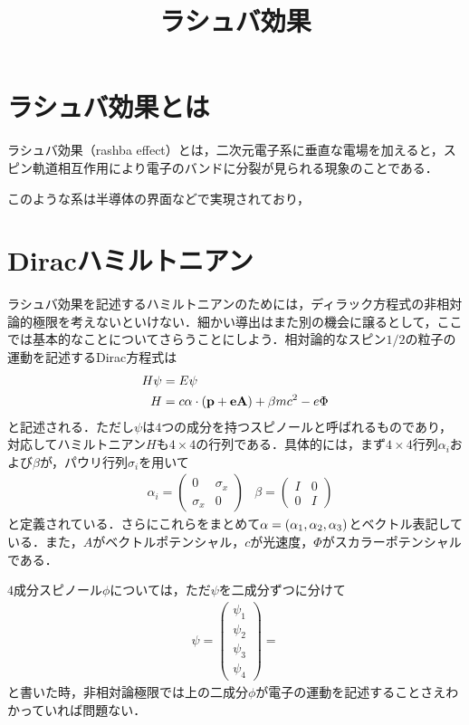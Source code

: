 \documentclass[a4j]{jarticle}
\title{ラシュバ効果}
\begin{document}
\maketitle
 \section{ラシュバ効果とは}
ラシュバ効果（rashba effect）とは，二次元電子系に垂直な電場を加えると，スピン軌道相互作用により電子のバンドに分裂が見られる現象のことである．

このような系は半導体の界面などで実現されており，

\section{Diracハミルトニアン}
ラシュバ効果を記述するハミルトニアンのためには，ディラック方程式の非相対論的極限を考えないといけない．細かい導出はまた別の機会に譲るとして，ここでは基本的なことについてさらうことにしよう．相対論的なスピン$1/2$の粒子の運動を記述するDirac方程式は
\begin{align*}
 H\psi &=E\psi \\
 H&=c{\bf\alpha}\cdot\left({\bf p}+{\bf eA}\right)+\beta mc^2-e\Phi
\end{align*}
と記述される．ただし$\psi$は$4$つの成分を持つスピノールと呼ばれるものであり，対応してハミルトニアン$H$も$4\times 4$の行列である．具体的には，まず$4\times 4$行列$\alpha_i$および$\beta$が，パウリ行列$\sigma_i$を用いて
\begin{align*}
 &\alpha_i=
\begin{pmatrix}
 0 & \sigma_x \\
 \sigma_x& 0 
\end{pmatrix}
 &\beta=
\begin{pmatrix}
 I & 0 \\
 0 & I
\end{pmatrix}
\end{align*}
と定義されている．さらにこれらをまとめて${\bf\alpha} =\left(\alpha_1,\alpha_2,\alpha_3\right)$とベクトル表記している．また，$A$がベクトルポテンシャル，$c$が光速度，$\Phi$がスカラーポテンシャルである．

$4$成分スピノール$\phi$については，ただ$\psi$を二成分ずつに分けて
\begin{align*}
 \psi = 
 \begin{pmatrix}
  \psi_1 \\
  \psi_2 \\
  \psi_3 \\
  \psi_4 
 \end{pmatrix}
 =
\end{align*}
と書いた時，非相対論極限では上の二成分$\phi$が電子の運動を記述することさえわかっていれば問題ない．
\end{document}
